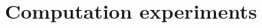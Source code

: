 \documentclass[11pt]{article}
\theoremstyle{definition}
\begin{document}

\section{Computation experiments}
\label{sec:analysis}
\end{document}
